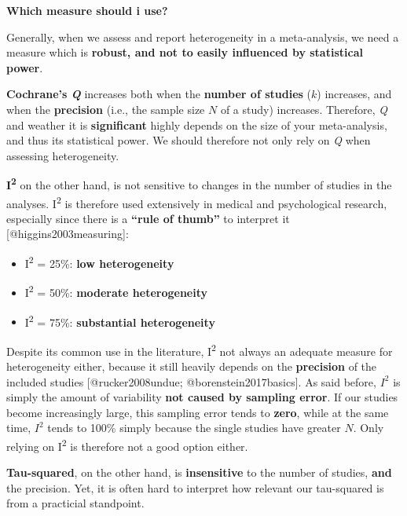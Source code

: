 \documentclass[]{book}
\providecommand{\tightlist}{%
  \setlength{\itemsep}{0pt}\setlength{\parskip}{0pt}}
\theoremstyle{definition}
\theoremstyle{definition}
\theoremstyle{definition}
\theoremstyle{remark}
\begin{document}
\begin{rmdachtung}
\textbf{Which measure should i use?}

Generally, when we assess and report heterogeneity in a meta-analysis,
we need a measure which is \textbf{robust, and not to easily influenced
by statistical power}.

\textbf{Cochrane's \emph{Q} } increases both when the \textbf{number of
studies} (\(k\)) increases, and when the \textbf{precision} (i.e., the
sample size \(N\) of a study) increases. Therefore, \emph{Q} and weather
it is \textbf{significant} highly depends on the size of your
meta-analysis, and thus its statistical power. We should therefore not
only rely on \emph{Q} when assessing heterogeneity.

\textbf{I\textsuperscript{2}} on the other hand, is not sensitive to
changes in the number of studies in the analyses. I\textsuperscript{2}
is therefore used extensively in medical and psychological research,
especially since there is a \textbf{``rule of thumb''} to interpret it
{[}@higgins2003measuring{]}:

\begin{itemize}
\tightlist
\item
  I\textsuperscript{2} = 25\%: \textbf{low heterogeneity}
\item
  I\textsuperscript{2} = 50\%: \textbf{moderate heterogeneity}
\item
  I\textsuperscript{2} = 75\%: \textbf{substantial heterogeneity}
\end{itemize}

Despite its common use in the literature, I\textsuperscript{2} not
always an adequate measure for heterogeneity either, because it still
heavily depends on the \textbf{precision} of the included studies
{[}@rucker2008undue; @borenstein2017basics{]}. As said before, \(I^{2}\)
is simply the amount of variability \textbf{not caused by sampling
error}. If our studies become increasingly large, this sampling error
tends to \textbf{zero}, while at the same time, \(I^{2}\) tends to 100\%
simply because the single studies have greater \(N\). Only relying on
I\textsuperscript{2} is therefore not a good option either.

\textbf{Tau-squared}, on the other hand, is \textbf{insensitive} to the
number of studies, \textbf{and} the precision. Yet, it is often hard to
interpret how relevant our tau-squared is from a practicial standpoint.


\end{rmdachtung}
\end{document}
